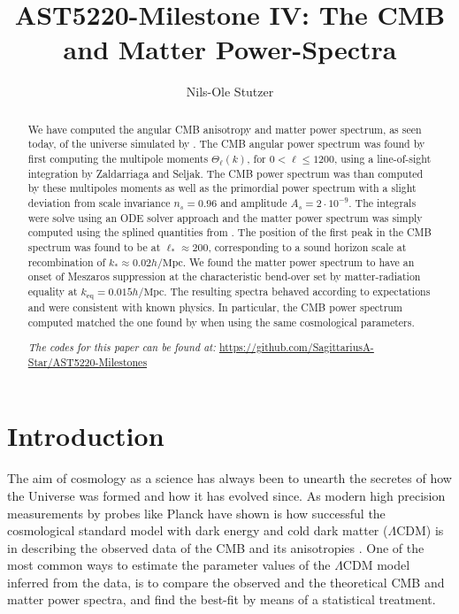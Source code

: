 \documentclass[twocolumn]{aastex62}
\begin{document}
\title{\Large AST5220-Milestone IV: The CMB and Matter Power-Spectra}

\author{Nils-Ole Stutzer}

\begin{abstract}
    We have computed the angular CMB anisotropy and matter power spectrum, as seen today, of the universe simulated by \cite{stutzer:2020a,stutzer:2020b,stutzer:2020c}. The CMB angular power spectrum was found by first computing the multipole moments $\Theta_\ell(k)$, for $0 < \ell \leq 1200$, using a line-of-sight integration by Zaldarriaga and Seljak. The CMB power spectrum was than computed by these multipoles moments as well as the primordial power spectrum with a slight deviation from scale invariance $n_s = 0.96$ and amplitude $A_s = 2\cdot 10^{-9}$. The integrals were solve using an ODE solver approach and the matter power spectrum was simply computed using the splined quantities from \cite{stutzer:2020c}. The position of the first peak in the CMB spectrum was found to be at $\ell_* \approx 200$, corresponding to a sound horizon scale at recombination of $k_*\approx 0.02 h/\mathrm{Mpc}$. We found the matter power spectrum to have an onset of Meszaros suppression at the characteristic bend-over set by matter-radiation equality at $k_\text{eq} = 0.015 h/\mathrm{Mpc}$. The resulting spectra behaved according to expectations and were consistent with known physics. In particular, the CMB power spectrum computed matched the one found by \cite{callin:2006} when using the same cosmological parameters.


    \textit{The codes for this paper can be found at:} \newline \url{https://github.com/SagittariusA-Star/AST5220-Milestones}
\end{abstract}

\section{Introduction} \label{sec:Intro}
The aim of cosmology as a science has always been to unearth the secretes of how the Universe was formed and how it has evolved since. As modern high precision
measurements by probes like Planck have shown is how successful the cosmological standard model with dark energy and cold dark matter ($\Lambda$CDM) is in describing the observed data of the CMB and its anisotropies \citep[]{planckcollaboration:2018}. One of the most common ways to estimate the parameter values of the $\Lambda$CDM model inferred from the data, is to compare the observed and the theoretical CMB and matter power spectra, and find the best-fit by means of a statistical treatment. 
\end{document}
